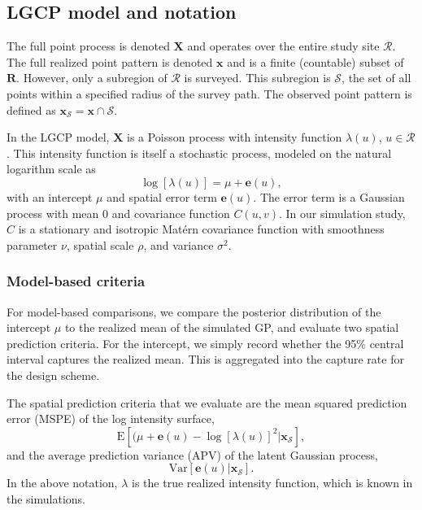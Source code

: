 \documentclass[review]{elsarticle}
\begin{document}
\subsection{LGCP model and notation}

The full point process is denoted \(\mathbf{X}\) and operates over the entire
study site \(\mathcal{R}\). The full realized point pattern is denoted
\(\mathbf{x}\) and is a finite (countable) subset of \(\mathbf{R}\). However,
only a subregion of \(\mathcal{R}\) is surveyed. This subregion is
\(\mathcal{S}\), the set of all points within a specified radius of the survey
path. The observed point pattern is defined as
\(\mathbf{x}_{\mathcal{S}} = \mathbf{x} \cap \mathcal{S}\).

In the LGCP model, \(\mathbf{X}\) is a Poisson process with intensity
function \(\lambda(u)\), \(u \in \mathcal{R}\). This intensity function is
itself a stochastic process, modeled on the natural logarithm scale as
\begin{equation}
\log[\lambda(u)] = \mu + \mathbf{e}(u),
\end{equation}
with an intercept \(\mu\) and spatial error term \(\mathbf{e}(u)\). The error
term is a Gaussian process with mean 0 and covariance function \(C(u, v)\).
In our simulation study, \(C\) is a stationary and isotropic Mat\'{e}rn
covariance function with smoothness parameter \(\nu\), spatial scale \(\rho\),
and variance \(\sigma^{2}\).


\subsubsection{Model-based criteria}

For model-based comparisons, we compare the posterior distribution of the
intercept \(\mu\) to the realized mean of the simulated GP, and evaluate two
spatial prediction criteria. For the intercept, we simply record whether the
95\% central interval captures the realized mean. This is aggregated into the
capture rate for the design scheme.

The spatial prediction criteria that we evaluate are the mean squared
prediction error (MSPE) of the log intensity surface,
\begin{equation}
\mathrm{E}[(\mu + \mathbf{e}(u) - \log[\lambda(u)]^{2}|\mathbf{x}_{\mathcal{S}}],
\end{equation}
and the average prediction variance (APV) of the latent Gaussian process,
\begin{equation}
\mathrm{Var}[\mathbf{e}(u)|\mathbf{x}_{\mathcal{S}}].
\end{equation}
In the above notation, \(\lambda\) is the true realized intensity function,
which is known in the simulations.
\end{document}
